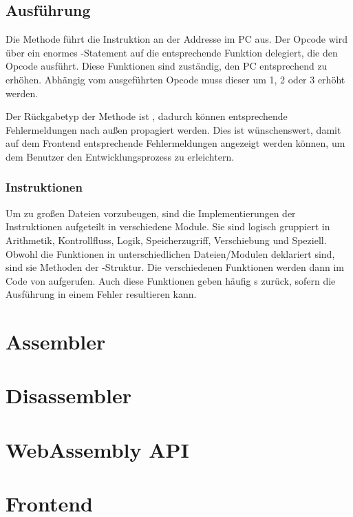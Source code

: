 \subsection{Ausführung}

Die  Methode führt die Instruktion an der Addresse im PC aus. Der Opcode wird über ein enormes -Statement auf die entsprechende Funktion delegiert, die den Opcode ausführt. Diese Funktionen sind zuständig, den \ac{PC} entsprechend zu erhöhen. Abhängig vom ausgeführten Opcode muss dieser um 1, 2 oder 3 erhöht werden.

Der Rückgabetyp der Methode ist , dadurch können entsprechende Fehlermeldungen nach außen propagiert werden. Dies ist wünschenswert, damit auf dem Frontend entsprechende Fehlermeldungen angezeigt werden können, um dem Benutzer den Entwicklungsprozess zu erleichtern.

\subsubsection{Instruktionen}

Um zu großen Dateien vorzubeugen, sind die Implementierungen der Instruktionen aufgeteilt in verschiedene Module. Sie sind logisch gruppiert in Arithmetik, Kontrollfluss, Logik, Speicherzugriff, Verschiebung und Speziell.
Obwohl die Funktionen in unterschiedlichen Dateien/Modulen deklariert sind, sind sie Methoden der -Struktur.
Die verschiedenen Funktionen werden dann im Code von  aufgerufen.
Auch diese Funktionen geben häufig s zurück, sofern die Ausführung in einem Fehler resultieren kann.

\section{Assembler}

\section{Disassembler}

\section{WebAssembly API}

\section{Frontend}
